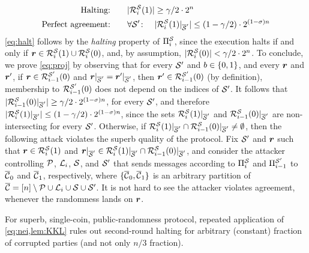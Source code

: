\begin{align}
\text{Halting:}&\qquad |\mathcal{R}_{i }^{\mathcal{S}}(1)|\ge \gamma/2 \cdot 2^{n} \label{eq:halt} \\
\text{Perfect agreement:}&\qquad \forall \mathcal{S}' \colon \quad |\mathcal{R}_{i}^{\mathcal{S}}(1)|_{\overline{\mathcal{S}}'}|\le (1-\gamma/2)\cdot 2^{(1-\sigma) n} \label{eq:proj}
\end{align}
\noindent
\cref{eq:halt} follows by the \emph{halting} property of $\Pi_{i}^{\mathcal{S}}$, since the execution halts if and only if ${ \boldsymbol{r}}\in \mathcal{R}_{i }^{\mathcal{S}}(1)\cup \mathcal{R}_{i }^{\mathcal{S}}(0)$, and, by assumption, $|\mathcal{R}_{i }^{\mathcal{S}}(0)|< \gamma/2 \cdot 2^{n}$.
To conclude, we prove \cref{eq:proj} by observing that for every $\mathcal{S}'$ and $b\in \{0,1\}$, and every ${ \boldsymbol{r}}$ and ${ \boldsymbol{r}}'$, if ${ \boldsymbol{r}}\in \mathcal{R}_{i-1}^{\mathcal{S}'}(0)$ and ${ \boldsymbol{r}}|_{\overline{\mathcal{S}}'}={ \boldsymbol{r}}'|_{\overline{\mathcal{S}}'}$, then ${ \boldsymbol{r}}'\in \mathcal{R}_{i-1}^{\mathcal{S}'}(0)$ (by definition), \ie membership to $\mathcal{R}_{i-1}^{\mathcal{S}'}(0)$ does not depend on the indices of $\mathcal{S}'$.
It follows that $|\mathcal{R}_{i-1}^{\mathcal{S}}(0)|_{\overline{\mathcal{S}}'}|\ge \gamma/2 \cdot 2^{(1-\sigma) n}$, for every $\mathcal{S}'$, and therefore $|\mathcal{R}_{i}^{\mathcal{S}}(1)|_{\overline{\mathcal{S}}'}|\le (1-\gamma/2)\cdot 2^{(1-\sigma) n}$, since the sets $\mathcal{R}_{i}^{\mathcal{S}}(1)|_{\overline{\mathcal{S}}'}$ and $\mathcal{R}_{i-1}^{\mathcal{S}}(0)|_{\overline{\mathcal{S}}'}$ are non-intersecting for every $\mathcal{S}'$.
Otherwise, if $\mathcal{R}_{i}^{\mathcal{S}}(1)|_{\overline{\mathcal{S}}'}\cap \mathcal{R}_{i-1}^{\mathcal{S}}(0)|_{\overline{\mathcal{S}}'}\neq \emptyset$, then the following attack violates the superb quality of the protocol. Fix $\mathcal{S}'$ and ${ \boldsymbol{r}}$ such that ${ \boldsymbol{r}}\in \mathcal{R}_{i}^{\mathcal{S}}(1)$ and ${ \boldsymbol{r}}|_{\overline{\mathcal{S}}'}\in \mathcal{R}_{i}^{\mathcal{S}}(1)|_{\overline{\mathcal{S}}'}\cap \mathcal{R}_{i-1}^{\mathcal{S}}(0)|_{\overline{\mathcal{S}}'}$, and consider the attacker controlling $\mathcal{P}$, ${\cal{L}}_{i}$, $\mathcal{S}$, and $\mathcal{S}'$ that sends
messages according to $\Pi_{i}^{\mathcal{S}}$ and $\Pi_{i-1}^{\mathcal{S}'}$ to $\overline{\mathcal{C}}_0$ and $\overline{\mathcal{C}}_1$, respectively, where $\{\overline{\mathcal{C}}_0,\overline{\mathcal{C}}_1\}$ is an arbitrary partition of $\overline{\mathcal{C}}=[n]\setminus \mathcal{P}\cup {\cal{L}}_{i} \cup \mathcal{S}\cup \mathcal{S}'$. It is not hard to see the attacker violates agreement, whenever the randomness lands on ${ \boldsymbol{r}}$.



\begin{remark}
For superb, single-coin, public-randomness protocol, repeated application of \cref{eq:nei,lem:KKL} rules out second-round halting for arbitrary (constant) fraction of corrupted parties (and not only $n/3$ fraction).
\end{remark}

